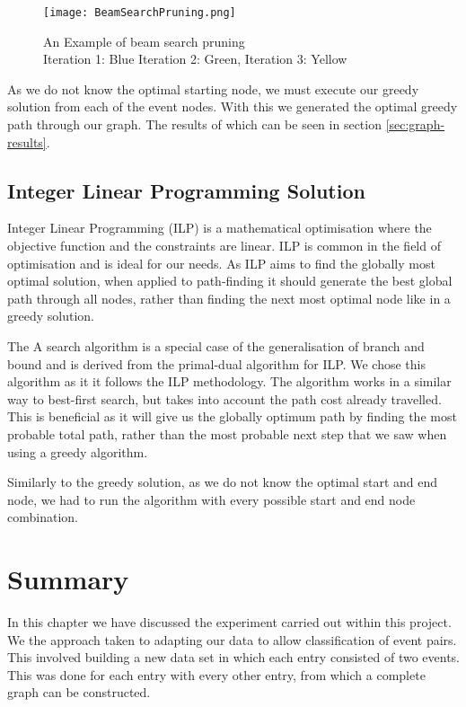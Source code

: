 \documentclass[bsc,frontabs,twoside,singlespacing,parskip,deptreport]{infthesis}     %
\begin{document}
\begin{figure}
  \texttt{[image: BeamSearchPruning.png]}
  \caption{An Example of beam search pruning\\ Iteration 1: Blue Iteration 2: Green, Iteration 3: Yellow}
  \label{fig:beam-prune}
\end{figure}

As we do not know the optimal starting node, we must execute our greedy solution from each of the event nodes.
With this we generated the optimal greedy path through our graph. The results of which can be seen in section \ref{sec:graph-results}.

\subsection{Integer Linear Programming Solution}
Integer Linear Programming (ILP) is a mathematical optimisation where the objective function and the constraints are linear.
ILP is common in the field of optimisation and is ideal for our needs. As ILP aims to find the globally most optimal solution, when applied to path-finding it
should generate the best global path through all nodes, rather than finding the next most optimal node like in a greedy solution.


The A\* search algorithm is a special case of the generalisation of branch and bound\cite{balas1983branch} and is derived from the primal-dual algorithm for ILP\cite{ye2012note}.
We chose this algorithm as it it follows the ILP methodology. The algorithm works in a similar way to best-first search, but takes into account the path cost already travelled.
This is beneficial as it will give us the globally optimum path by finding the most probable total path, rather than the most probable next step that we saw when using a
greedy algorithm.

Similarly to the greedy solution, as we do not know the optimal start and end node, we had to run the algorithm with every possible start and end node combination.


\section{Summary}
In this chapter we have discussed the experiment carried out within this project.
We the approach taken to adapting our data to allow classification of event pairs. This involved building a new data set
in which each entry consisted of two events. This was done for each entry with every other entry, from which a complete
graph can be constructed.
\end{document}
